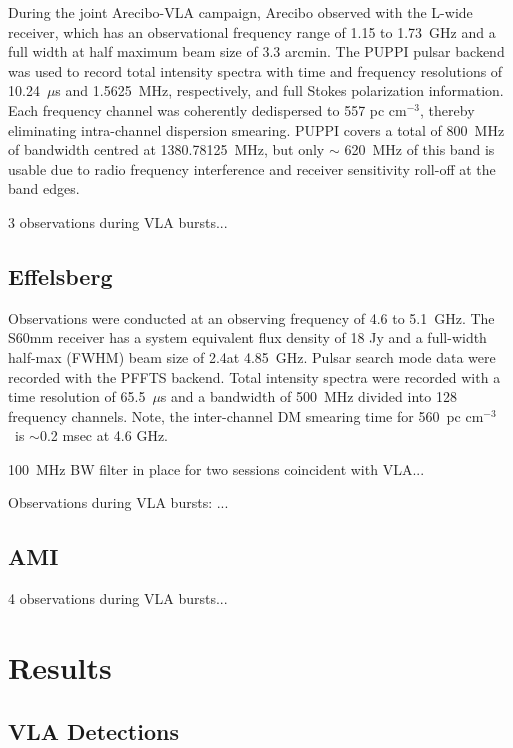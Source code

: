 \documentclass{emulateapj}
\begin{document}
During the joint Arecibo-VLA campaign, Arecibo observed with the L-wide receiver, which has an observational frequency range of 1.15 to 1.73~GHz and a full width at half maximum beam size of 3.3 arcmin. The PUPPI pulsar backend was used to record total intensity spectra with time and frequency resolutions of 10.24~$\mu$s and 1.5625~MHz, respectively, and full Stokes polarization information. Each frequency channel was coherently dedispersed to 557 pc cm$^{-3}$, thereby eliminating intra-channel dispersion smearing. PUPPI covers a total of 800~MHz of bandwidth centred at 1380.78125~MHz, but only $\sim$ 620~MHz of this band is usable due to radio frequency interference and receiver sensitivity roll-off at the band edges.

3 observations during VLA bursts...

\subsection{Effelsberg}

Observations were conducted at an observing frequency of 4.6 to 5.1~GHz. The S60mm receiver has a system equivalent flux density of 18 Jy and a full-width half-max (FWHM) beam size of 2.4\arcmin at 4.85~GHz. Pulsar search mode data were recorded with the PFFTS backend. Total intensity spectra were recorded with a time resolution of 65.5~$\mu$s and a bandwidth of 500~MHz divided into 128 frequency channels. Note, the inter-channel DM smearing time for 560~pc cm$^{-3}$\ is $\sim$0.2 msec at 4.6 GHz.

100~MHz BW filter in place for two sessions coincident with VLA...

Observations during VLA bursts:
...

\subsection{AMI}

4 observations during VLA bursts...

\section{Results}

\subsection{VLA Detections}
\end{document}
